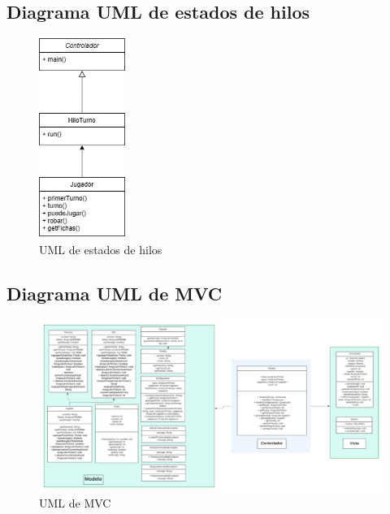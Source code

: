 \documentclass[12pt]{article}
\begin{document}
  \newpage
  \subsection{Diagrama UML de estados de hilos}
  \begin{figure}[h!]
    \centering
    \includegraphics[width=0.25\textwidth]{umlh.jpg}
    \caption{UML de estados de hilos}
  \end{figure}


  \subsection{Diagrama UML de MVC}  
  \begin{figure}
    \centering
    \includegraphics[width=\textheight]{umlmvc.jpeg} 
    \caption{UML de MVC}
  \end{figure}
  \newpage
\end{document}

